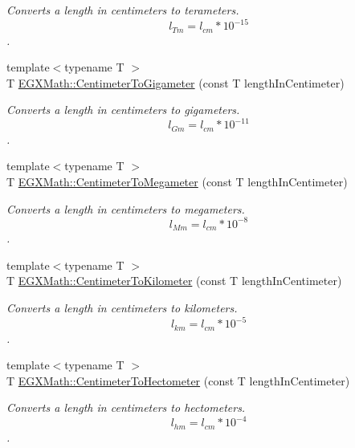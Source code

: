 \begin{DoxyCompactItemize}
\begin{DoxyCompactList}\small\item\em Converts a length in centimeters to terameters. \[ l_{Tm}=l_{cm} * 10^{-15} \]. \end{DoxyCompactList}\item 
{\footnotesize template$<$typename T $>$ }\\T \mbox{\hyperlink{group___e_g_x_math-_conversions-_length_conversions-_s_i-_centimeter-_s_i_gaf3656a809d74231d75f33a9485e4f454}{E\+G\+X\+Math\+::\+Centimeter\+To\+Gigameter}} (const T length\+In\+Centimeter)
\begin{DoxyCompactList}\small\item\em Converts a length in centimeters to gigameters. \[ l_{Gm}=l_{cm} * 10^{-11} \]. \end{DoxyCompactList}\item 
{\footnotesize template$<$typename T $>$ }\\T \mbox{\hyperlink{group___e_g_x_math-_conversions-_length_conversions-_s_i-_centimeter-_s_i_ga5ba81fb6190e6ce0032410d703d5073b}{E\+G\+X\+Math\+::\+Centimeter\+To\+Megameter}} (const T length\+In\+Centimeter)
\begin{DoxyCompactList}\small\item\em Converts a length in centimeters to megameters. \[ l_{Mm}=l_{cm} * 10^{-8} \]. \end{DoxyCompactList}\item 
{\footnotesize template$<$typename T $>$ }\\T \mbox{\hyperlink{group___e_g_x_math-_conversions-_length_conversions-_s_i-_centimeter-_s_i_ga3735c75e13286501568075ee1dfb97b7}{E\+G\+X\+Math\+::\+Centimeter\+To\+Kilometer}} (const T length\+In\+Centimeter)
\begin{DoxyCompactList}\small\item\em Converts a length in centimeters to kilometers. \[ l_{km}=l_{cm} * 10^{-5} \]. \end{DoxyCompactList}\item 
{\footnotesize template$<$typename T $>$ }\\T \mbox{\hyperlink{group___e_g_x_math-_conversions-_length_conversions-_s_i-_centimeter-_s_i_ga311c96c2d32cb295453bff9cbdfd8cdc}{E\+G\+X\+Math\+::\+Centimeter\+To\+Hectometer}} (const T length\+In\+Centimeter)
\begin{DoxyCompactList}\small\item\em Converts a length in centimeters to hectometers. \[ l_{hm}=l_{cm} * 10^{-4} \]. \end{DoxyCompactList}\item 

\end{DoxyCompactItemize}
